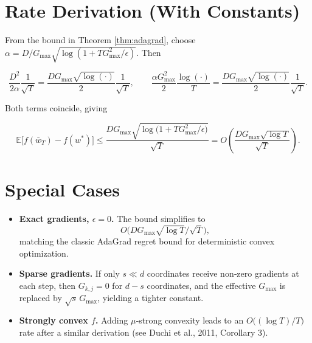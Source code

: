 \documentclass{article}
\newcommand{\E}{\mathbb{E}}
\begin{document}
\section*{Rate Derivation (With Constants)}
From the bound in Theorem \ref{thm:adagrad},
choose $\alpha = D/ G_{\max}\sqrt{\log(1+TG_{\max}^{2}/\epsilon)}$.
Then

\[
\frac{D^{2}}{2\alpha}\frac{1}{\sqrt{T}}
= \frac{D G_{\max}\sqrt{\log(\cdot)}}{2}\frac{1}{\sqrt{T}},
\qquad
\frac{\alpha G_{\max}^{2}}{2}\frac{\log(\cdot)}{T}
= \frac{D G_{\max}\sqrt{\log(\cdot)}}{2}\frac{1}{\sqrt{T}} .
\]

Both terms coincide, giving

\[
\E\!\bigl[f(\bar w_T)-f(w^{\ast})\bigr]
\le
\frac{D G_{\max}\sqrt{\log\!\bigl(1+TG_{\max}^{2}/\epsilon\bigr)}}{\sqrt{T}}
=
O\!\left(\frac{DG_{\max}\sqrt{\log T}}{\sqrt{T}}\right).
\]

\section*{Special Cases}
\begin{itemize}
\item \textbf{Exact gradients, $\epsilon=0$.}  The bound simplifies to
\[
O\!\bigl(DG_{\max}\sqrt{\log T}/\sqrt{T}\bigr),
\]
matching the classic AdaGrad regret bound for deterministic convex optimization.
\item \textbf{Sparse gradients.}  If only $s\ll d$ coordinates receive non‑zero gradients at each step, then $G_{k,j}=0$ for $d-s$ coordinates, and the effective $G_{\max}$ is replaced by $\sqrt{s}\,G_{\max}$, yielding a tighter constant.
\item \textbf{Strongly convex $f$.}  Adding $\mu$‑strong convexity leads to an $O\bigl((\log T)/T\bigr)$ rate after a similar derivation (see Duchi et al., 2011, Corollary 3).
\end{itemize}
\end{document}
